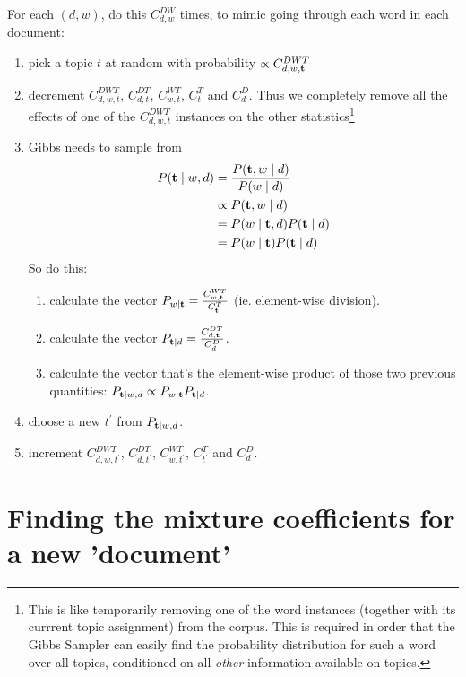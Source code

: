 \documentclass[11pt]{article}
\begin{document}
For each $(d,w)$, do this $C^{DW}_{d,w}$ times, to mimic going through
each word in each document:
\begin{enumerate}
\item pick a topic $t$ at random with probability  $\propto C^{DWT}_{d,w,\mathbf{t}}$
\item decrement $C^{DWT}_{d,w,t}$, $C^{DT}_{d,t}$, $C^{WT}_{w,t}$,
  $C^{T}_{t}$ and $C^{D}_{d}$. Thus we completely remove all the
  effects of one of the $C^{DWT}_{d,w,t}$ instances on the other
  statistics\footnote{This is like temporarily removing one of the word
  instances (together with its currrent topic assignment) from the
  corpus. This is required in order that the Gibbs Sampler can easily
  find the probability distribution for such a word over all topics,
  conditioned on all {\it other} information available on topics.}

\item Gibbs needs to sample from 
\begin{align*}
P(\mathbf{t} \mid w,d) &= \frac{P(\mathbf{t}, w \mid d)}{P(w \mid d)} \\
 &\propto P(\mathbf{t}, w \mid d) \\
 &= P(w \mid \mathbf{t}, d) P(\mathbf{t} \mid d)  \\
 &= P(w \mid \mathbf{t}) P(\mathbf{t} \mid d) 
\end{align*}
So do this:
  \begin{enumerate}
  \item calculate the vector $P_{w|\mathbf{t}} =
    \frac{C^{WT}_{w,\mathbf{t}}}{C^T_{\mathbf{t}}} $ (ie. element-wise division).

  \item calculate the vector $P_{\mathbf{t}|d} = \frac{C^{DT}_{d,\mathbf{t}}}{C^D_d} $. 
    
  \item calculate the vector that's the element-wise product of those two previous quantities: $\displaystyle P_{\mathbf{t} | w,d} \propto P_{w|\mathbf{t}}  P_{\mathbf{t}|d} $.
  \end{enumerate}

\item choose a new $t^\prime$ from $P_{\mathbf{t} | w,d}$.

\item increment $C^{DWT}_{d,w,t^\prime}$, $C^{DT}_{d,t^\prime}$, $C^{WT}_{w,t^\prime}$, $C^{T}_{t^\prime}$ and $C^{D}_{d}$.
\end{enumerate}


\section{Finding the mixture coefficients for a new 'document' \label{sec:newdoc}}
\end{document}
